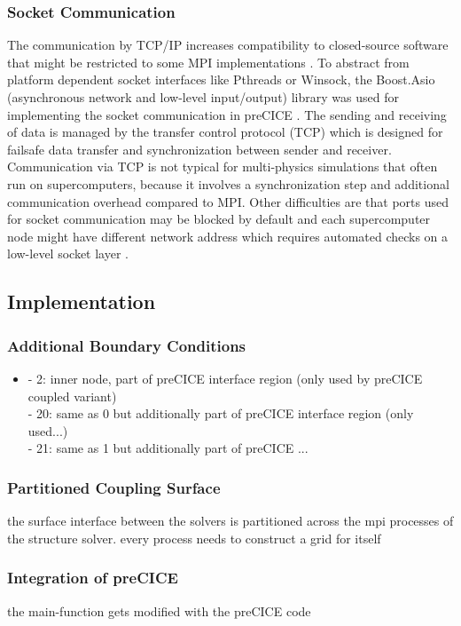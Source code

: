   \subsubsection{Socket Communication}
   The communication by TCP/IP increases compatibility to closed-source software that might be restricted to some MPI implementations \cite{bungartz2015fully}. To abstract from platform dependent socket interfaces like Pthreads or Winsock, the Boost.Asio (asynchronous network and low-level input/output) library was used for implementing the socket communication in preCICE \cite{gatzhammer2015efficient}. The sending and receiving of data is managed by the transfer control protocol (TCP) which is designed for failsafe data transfer and synchronization between sender and receiver. Communication via TCP is not typical for multi-physics simulations that often run on supercomputers, because it involves a synchronization step and additional communication overhead compared to MPI. Other difficulties are that ports used for socket communication may be blocked by default and each supercomputer node might have different network address which requires automated checks on a low-level socket layer \cite{gatzhammer2015efficient}.


 \subsection{Implementation}
 
  \subsubsection{Additional Boundary Conditions}
   \begin{itemize}
  	\item - 2: inner node, part of preCICE interface region (only used by preCICE coupled variant)\\
  	- 20: same as 0 but additionally part of preCICE interface region (only used...)\\
  	- 21: same as 1 but additionally part of preCICE ...
  	\end{itemize}
  
  	
  \subsubsection{Partitioned Coupling Surface}
   the surface interface between the solvers is partitioned across the mpi processes of the structure solver. every process needs to construct a grid for itself
   
   
  \subsubsection{Integration of preCICE}
   the main-function gets modified with the preCICE code
 
\newpage